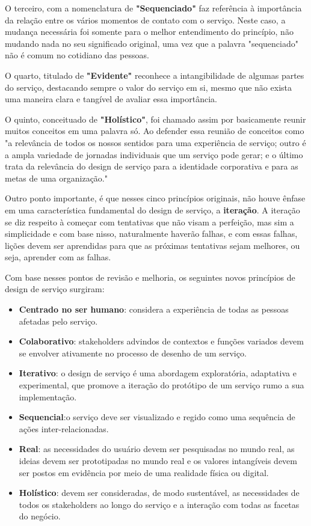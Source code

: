 O terceiro, com a nomenclatura de \textbf{"Sequenciado"} faz referência à importância da relação entre os vários momentos de contato com o serviço. Neste caso, a mudança necessária foi somente para o melhor entendimento do princípio, não mudando nada no seu significado original, uma vez que a palavra "sequenciado" não é comum no cotidiano das pessoas. 

O quarto, titulado de \textbf{"Evidente"} reconhece a intangibilidade de algumas partes do serviço, destacando sempre o valor do serviço em si, mesmo que não exista uma maneira clara e tangível de avaliar essa importância.

O quinto, conceituado de \textbf{"Holístico"}, foi chamado assim por basicamente reunir muitos conceitos em uma palavra só. Ao defender essa reunião de conceitos como "a relevância de todos os nossos sentidos para uma experiência de serviço; outro é a ampla variedade de jornadas individuais que um serviço pode gerar; e o último trata da relevância do design de serviço para a identidade corporativa e para as metas de uma organização."\cite{Stickdorn2019} 

Outro ponto importante, é que nesses cinco princípios originais, não houve ênfase em uma característica fundamental do design de serviço, a \textbf{iteração}. A iteração se diz respeito à começar com tentativas que não visam a perfeição, mas sim a simplicidade e com base nisso, naturalmente haverão falhas, e com essas falhas, lições devem ser aprendidas para que as próximas tentativas sejam melhores, ou seja, aprender com as falhas.

Com base nesses pontos de revisão e melhoria, os seguintes novos princípios de design de serviço surgiram: \cite{Stickdorn2019}

\begin{itemize}
	\item \textbf{Centrado no ser humano}: considera a experiência de todas as pessoas afetadas pelo serviço.
	\item \textbf{Colaborativo}: stakeholders advindos de contextos e funções variados devem se envolver ativamente no processo de desenho de um serviço.
	\item \textbf{Iterativo}: o design de serviço é uma abordagem exploratória, adaptativa e experimental, que promove a iteração do protótipo de um serviço rumo a sua implementação.
	\item \textbf{Sequencial}:o serviço deve ser visualizado e regido como uma sequência de ações inter-relacionadas.
	\item \textbf{Real}: as necessidades do usuário devem ser pesquisadas no mundo real, as ideias devem ser prototipadas no mundo real e os valores intangíveis devem ser postos em evidência por meio de uma realidade física ou digital.
	\item \textbf{Holístico}:  devem ser consideradas, de modo sustentável, as necessidades de todos os stakeholders ao longo do serviço e a interação com todas as facetas do negócio.
\end{itemize}

